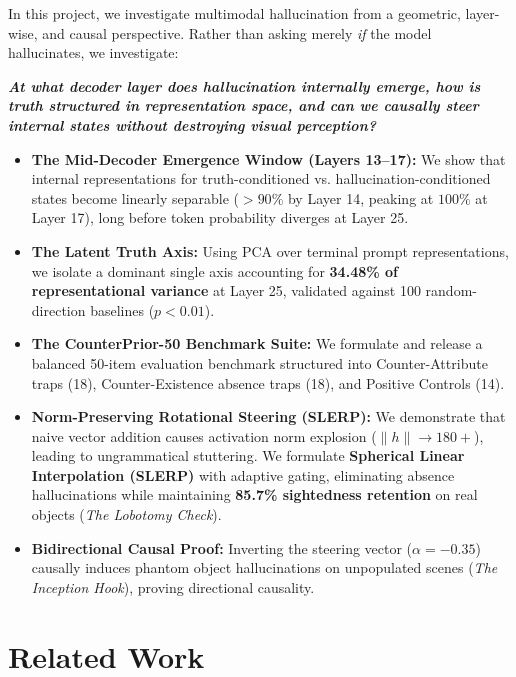 \documentclass[11pt]{article}
\begin{document}
In this project, we investigate multimodal hallucination from a geometric, layer-wise, and causal perspective. Rather than asking merely \textit{if} the model hallucinates, we investigate:
\begin{center}
\textbf{\textit{At what decoder layer does hallucination internally emerge, how is truth structured in representation space, and can we causally steer internal states without destroying visual perception?}}
\end{center}

\begin{tcolorbox}[colback=gray!10, colframe=black, title=Core Contributions of This Project]
\begin{itemize}
    \item \textbf{The Mid-Decoder Emergence Window (Layers 13--17):} We show that internal representations for truth-conditioned vs. hallucination-conditioned states become linearly separable ($>90\%$ by Layer 14, peaking at $100\%$ at Layer 17), long before token probability diverges at Layer 25.
    \item \textbf{The Latent Truth Axis:} Using PCA over terminal prompt representations, we isolate a dominant single axis accounting for \textbf{34.48\% of representational variance} at Layer 25, validated against 100 random-direction baselines ($p < 0.01$).
    \item \textbf{The CounterPrior-50 Benchmark Suite:} We formulate and release a balanced 50-item evaluation benchmark structured into Counter-Attribute traps (18), Counter-Existence absence traps (18), and Positive Controls (14).
    \item \textbf{Norm-Preserving Rotational Steering (SLERP):} We demonstrate that naive vector addition causes activation norm explosion ($\|h\| \to 180+$), leading to ungrammatical stuttering. We formulate \textbf{Spherical Linear Interpolation (SLERP)} with adaptive gating, eliminating absence hallucinations while maintaining \textbf{85.7\% sightedness retention} on real objects (\textit{The Lobotomy Check}).
    \item \textbf{Bidirectional Causal Proof:} Inverting the steering vector ($\alpha = -0.35$) causally induces phantom object hallucinations on unpopulated scenes (\textit{The Inception Hook}), proving directional causality.
\end{itemize}
\end{tcolorbox}

\section{Related Work}
\end{document}
